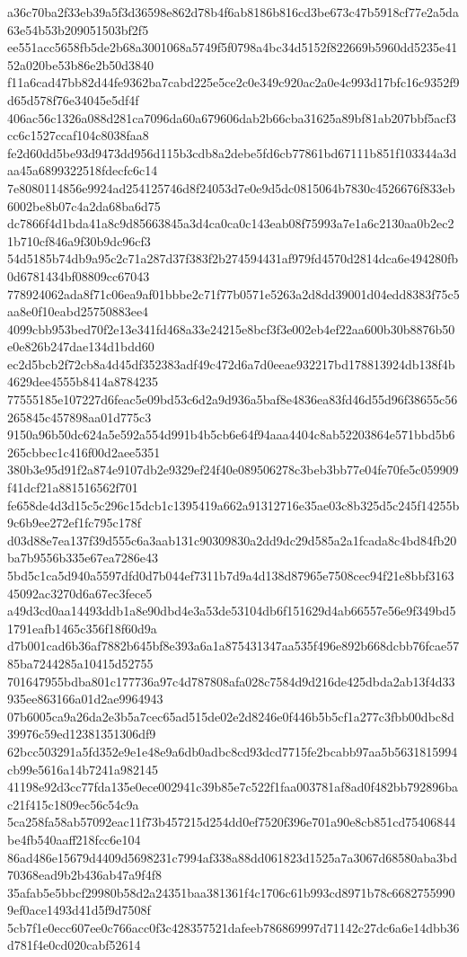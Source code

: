 {a36c70ba2f33eb39a5f3d36598e862d78b4f6ab8186b816cd3be673c47b5918cf77e2a5da63e54b53b209051503bf2f5
ee551acc5658fb5de2b68a3001068a5749f5f0798a4bc34d5152f822669b5960dd5235e4152a020be53b86e2b50d3840
f11a6cad47bb82d44fe9362ba7cabd225e5ce2c0e349c920ac2a0e4c993d17bfc16c9352f9d65d578f76e34045e5df4f
406ac56c1326a088d281ca7096da60a679606dab2b66cba31625a89bf81ab207bbf5acf3cc6c1527ccaf104c8038faa8
fe2d60dd5be93d9473dd956d115b3cdb8a2debe5fd6cb77861bd67111b851f103344a3daa45a6899322518fdecfc6c14
7e8080114856e9924ad254125746d8f24053d7e0e9d5dc0815064b7830c4526676f833eb6002be8b07c4a2da68ba6d75
dc7866f4d1bda41a8c9d85663845a3d4ca0ca0c143eab08f75993a7e1a6c2130aa0b2ec21b710cf846a9f30b9dc96cf3
54d5185b74db9a95c2c71a287d37f383f2b274594431af979fd4570d2814dca6e494280fb0d6781434bf08809cc67043
778924062ada8f71c06ea9af01bbbe2c71f77b0571e5263a2d8dd39001d04edd8383f75c5aa8e0f10eabd25750883ee4
4099cbb953bed70f2e13e341fd468a33e24215e8bcf3f3e002eb4ef22aa600b30b8876b50e0e826b247dae134d1bdd60
ec2d5bcb2f72cb8a4d45df352383adf49c472d6a7d0eeae932217bd178813924db138f4b4629dee4555b8414a8784235
77555185e107227d6feac5e09bd53c6d2a9d936a5baf8e4836ea83fd46d55d96f38655c56265845c457898aa01d775c3
9150a96b50dc624a5e592a554d991b4b5cb6e64f94aaa4404c8ab52203864e571bbd5b6265cbbec1c416f00d2aee5351
380b3e95d91f2a874e9107db2e9329ef24f40e089506278c3beb3bb77e04fe70fe5c059909f41dcf21a881516562f701
fe658de4d3d15c5c296c15dcb1c1395419a662a91312716e35ae03c8b325d5c245f14255b9c6b9ee272ef1fc795c178f
d03d88e7ea137f39d555c6a3aab131c90309830a2dd9dc29d585a2a1fcada8c4bd84fb20ba7b9556b335e67ea7286e43
5bd5c1ca5d940a5597dfd0d7b044ef7311b7d9a4d138d87965e7508cec94f21e8bbf316345092ac3270d6a67ec3fece5
a49d3cd0aa14493ddb1a8e90dbd4e3a53de53104db6f151629d4ab66557e56e9f349bd51791eafb1465c356f18f60d9a
d7b001cad6b36af7882b645bf8e393a6a1a875431347aa535f496e892b668dcbb76fcae5785ba7244285a10415d52755
701647955bdba801c177736a97c4d787808afa028c7584d9d216de425dbda2ab13f4d33935ee863166a01d2ae9964943
07b6005ca9a26da2e3b5a7cec65ad515de02e2d8246e0f446b5b5cf1a277c3fbb00dbc8d39976c59ed12381351306df9
62bcc503291a5fd352e9e1e48e9a6db0adbc8cd93dcd7715fe2bcabb97aa5b5631815994cb99e5616a14b7241a982145
41198e92d3cc77fda135e0ece002941c39b85e7c522f1faa003781af8ad0f482bb792896bac21f415c1809ec56c54c9a
5ca258fa58ab57092eac11f73b457215d254dd0ef7520f396e701a90e8cb851cd75406844be4fb540aaff218fcc6e104
86ad486e15679d4409d5698231c7994af338a88dd061823d1525a7a3067d68580aba3bd70368ead9b2b436ab47a9f4f8
35afab5e5bbcf29980b58d2a24351baa381361f4c1706c61b993cd8971b78c66827559909ef0ace1493d41d5f9d7508f
5cb7f1e0ecc607ee0c766acc0f3c428357521dafeeb786869997d71142c27dc6a6e14dbb36d781f4e0cd020cabf52614
}
